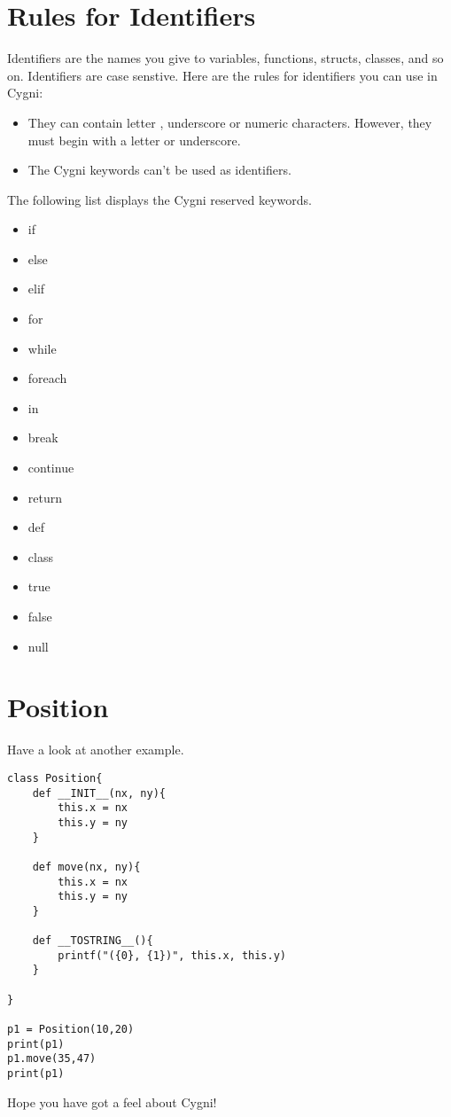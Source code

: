 \section{Rules for Identifiers}
Identifiers are the names you give to variables, functions, structs, classes, and so on. Identifiers are case senstive. Here are the rules for identifiers you can use in Cygni:
\begin{itemize}
	\item They can contain letter , underscore or numeric characters. However, they must begin with a letter or underscore.
	\item The Cygni keywords can't be used as identifiers.
\end{itemize}

The following list displays the Cygni reserved keywords.
\begin{itemize}
	\item if
	\item else
	\item elif
	\item for
	\item while
	\item foreach
	\item in
	\item break
	\item continue
	\item return
	\item def
	\item class
	\item true
	\item false
	\item null
\end{itemize}

\section{Position}
Have a look at another example.
\begin{lstlisting}
class Position{
	def __INIT__(nx, ny){
		this.x = nx
		this.y = ny
	}
	
	def move(nx, ny){
		this.x = nx
		this.y = ny
	}
	
	def __TOSTRING__(){
		printf("({0}, {1})", this.x, this.y)
	}
	
}

p1 = Position(10,20)
print(p1)
p1.move(35,47)
print(p1)
\end{lstlisting}	

Hope you have got a feel about Cygni!
